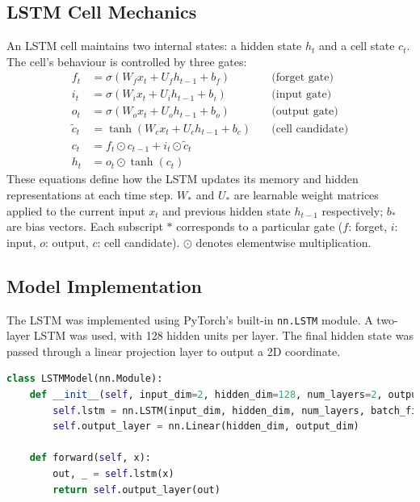\subsection*{LSTM Cell Mechanics}
An LSTM cell maintains two internal states: a hidden state $h_t$ and a cell state $c_t$. The cell's behaviour is controlled by three gates:
\[
\begin{aligned}
f_t &= \sigma(W_f x_t + U_f h_{t-1} + b_f) \quad &\text{(forget gate)} \\
i_t &= \sigma(W_i x_t + U_i h_{t-1} + b_i) \quad &\text{(input gate)} \\
o_t &= \sigma(W_o x_t + U_o h_{t-1} + b_o) \quad &\text{(output gate)} \\
\tilde{c}_t &= \tanh(W_c x_t + U_c h_{t-1} + b_c) \quad &\text{(cell candidate)} \\
c_t &= f_t \odot c_{t-1} + i_t \odot \tilde{c}_t \\
h_t &= o_t \odot \tanh(c_t)
\end{aligned}
\]
These equations define how the LSTM updates its memory and hidden representations at each time step. $W_*$ and $U_*$ are learnable weight matrices applied to the current input $x_t$ and previous hidden state $h_{t-1}$ respectively; $b_*$ are bias vectors. Each subscript $*$ corresponds to a particular gate ($f$: forget, $i$: input, $o$: output, $c$: cell candidate). $\odot$ denotes elementwise multiplication.

\subsection*{Model Implementation}
The LSTM was implemented using PyTorch's built-in \texttt{nn.LSTM} module. A two-layer LSTM was used, with 128 hidden units per layer. The final hidden state was passed through a linear projection layer to output a 2D coordinate.

\begin{lstlisting}[language=Python, caption={Simplified LSTM model structure}]
class LSTMModel(nn.Module):
    def __init__(self, input_dim=2, hidden_dim=128, num_layers=2, output_dim=2):
        self.lstm = nn.LSTM(input_dim, hidden_dim, num_layers, batch_first=True)
        self.output_layer = nn.Linear(hidden_dim, output_dim)

    def forward(self, x):
        out, _ = self.lstm(x)
        return self.output_layer(out)
\end{lstlisting}

